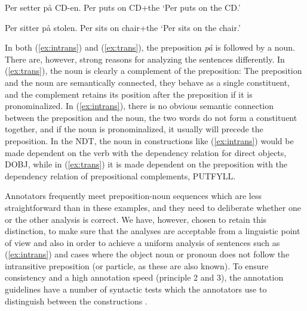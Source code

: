 \documentclass[11pt,a4paper]{article}
\begin{document}
\begin{examples}
\item\label{ex:intrans}
\gll Per setter på CD-en.
Per puts on CD+the
\glt `Per puts on the CD.'
\glend

\item\label{ex:trans}
\gll Per sitter på stolen.
Per sits on chair+the
\glt `Per sits on the chair.'
\glend
\end{examples}

In both (\ref{ex:intrans}) and (\ref{ex:trans}), the preposition \emph{på} is followed by a noun. There are, however, strong reasons for analyzing the sentences differently. In (\ref{ex:trans}), the noun is clearly a complement of the preposition: The preposition and the noun are semantically connected, they behave as a single constituent, and the complement retains its position after the preposition if it is pronominalized. In (\ref{ex:intrans}), there is no obvious semantic connection between the preposition and the noun, the two words do not form a constituent together, and if the noun is pronominalized, it usually will precede the preposition. In the NDT, the noun in constructions like (\ref{ex:intrans}) would be made dependent on the verb with the dependency relation for direct objects, DOBJ, while in (\ref{ex:trans}) it is made dependent on the preposition with the dependency relation of prepositional complements, PUTFYLL.

Annotators frequently meet preposition-noun sequences which are less straightforward than in these examples, and they need to deliberate whether one or the other analysis is correct. We have, however, chosen to retain this distinction, to make sure that the analyses are acceptable from a linguistic point of view and also in order to achieve a uniform analysis of sentences such as (\ref{ex:intrans}) and cases where the object noun or pronoun does not follow the intransitive preposition (or particle, as these are also known). To ensure consistency and a high annotation speed (principle 2 and 3), the annotation guidelines have a number of syntactic tests which the annotators use to distinguish between the constructions \cite[54-56]{Kin:Sol:Eri:2013}.
\end{document}
